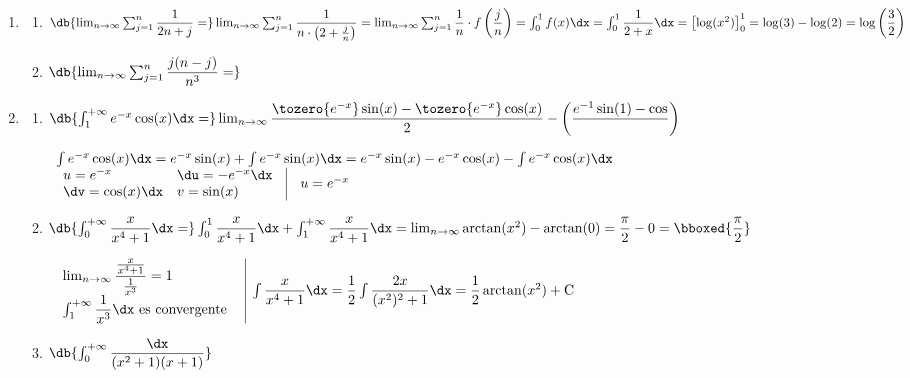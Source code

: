 \begin{enumerate}[label=\color{red}\textbf{\arabic*)}, leftmargin=*]
\begin{enumerate}[label=\color{red}\alph*)]
	\end{enumerate}
	\item {}
	\begin{enumerate}[label=\color{lightblue}\arabic*)]
		\item $\db{\lim_{n\to\infty}\sum_{j=1}^{n}\dfrac{1}{2n+j}=}\lim_{n\to\infty}\sum_{j=1}^{n}\dfrac{1}{n\cdot\left(2+\frac{j}{n}\right)}=\lim_{n\to\infty}\sum_{j=1}^{n}\dfrac{1}{n}\cdot f\left(\dfrac{j}{n}\right)=\int_{0}^{1}f(x)\dx=\int_{0}^{1}\dfrac{1}{2+x}\dx=\left[\log(x^2)\right]_{0}^{1}=\log(3)-\log(2)=\log\left(\dfrac{3}{2}\right)$
            
            
		\item $\db{\lim_{n\to\infty}\sum_{j=1}^{n}\dfrac{j(n-j)}{n^3}=}$
	\end{enumerate}
	\item {}
	\begin{enumerate}[label=\color{red}\alph*)]
		\item $\db{\int_{1}^{+\infty}e^{-x}\cos(x)\dx=}\lim_{n\to\infty}\dfrac{\tozero{e^{-x}}\sin(x)-\tozero{e^{-x}}\cos(x)}{2}-\left(\dfrac{e^{-1}\sin(1)-\cos}{}\right)$
            
            $\begin{array}{l|l}
                  \multicolumn{2}{l}{\int e^{-x}\cos(x)\dx=e^{-x}\sin(x)+\int e^{-x}\sin(x)\dx=e^{-x}\sin(x)-e^{-x}\cos(x)-\int e^{-x}\cos(x)\dx}\\
                  \begin{array}{ll}
                        u=e^{-x} & \du=-e^{-x}\dx\\
                        \dv=\cos(x)\dx & v=\sin(x)
                  \end{array} & \begin{array}{l}
                  u=e^{-x}
                  \end{array}
            \end{array}$
		\item $\db{\int_{0}^{+\infty}\dfrac{x}{x^4+1}\dx=}\int_{0}^{1}\dfrac{x}{x^4+1}\dx+\int_{1}^{+\infty}\dfrac{x}{x^4+1}\dx=\lim_{n\to\infty}\arctan(x^2)-\arctan(0)=\dfrac{\pi}{2}-0=\bboxed{\dfrac{\pi}{2}}$
            
            $\begin{array}{l|l}
                  \begin{array}{l}
                        \lim_{n\to\infty}\dfrac{\frac{x}{x^4+1}}{\frac{1}{x^3}}=1\\
                        \int_{1}^{+\infty}\dfrac{1}{x^3}\dx\text{ es convergente }
                  \end{array} & \int\dfrac{x}{x^4+1}\dx=\dfrac{1}{2}\int\dfrac{2x}{(x^2)^2+1}\dx=\dfrac{1}{2}\arctan(x^2)+\mathrm{C}
            \end{array}$
		\item $\db{\int_{0}^{+\infty}\dfrac{\dx}{(x^2+1)(x+1)}}$
            

\end{enumerate}
\end{enumerate}
